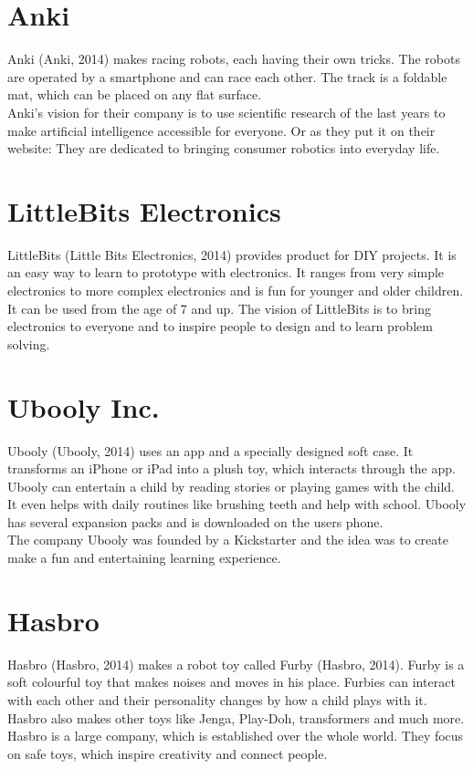 \documentclass[11pt,twoside,a4paper]{report}
\begin{document}
\begin{appendices}
\section{Anki}
Anki (Anki, 2014) makes racing robots, each having their own tricks. The robots are operated by a smartphone and can race each other. The track is a foldable mat, which can be placed on any flat surface. \\
Anki\rq{}s vision for their company is to use scientific research of the last years to make artificial intelligence accessible for everyone. Or as they put it on their website: They are dedicated to bringing consumer robotics into everyday life.
\section{LittleBits Electronics}
LittleBits (Little Bits Electronics, 2014) provides product for DIY projects. It is an easy way to learn to prototype with electronics. It ranges from very simple electronics to more complex electronics and is fun for younger and older children. It can be used from the age of 7 and up. The vision of LittleBits is to bring electronics to everyone and to inspire people to design and to learn problem solving.
\section{Ubooly Inc.}
Ubooly (Ubooly, 2014) uses an app and a specially designed soft case. It transforms an iPhone or iPad into a plush toy, which interacts through the app. Ubooly can entertain a child by reading stories or playing games with the child. It even helps with daily routines like brushing teeth and help with school. Ubooly has several expansion packs and is downloaded on the users phone. \\
The company Ubooly was founded by a Kickstarter and the idea was to create make a fun and entertaining learning experience.
\section{Hasbro}
Hasbro (Hasbro, 2014) makes a robot toy called Furby (Hasbro, 2014). Furby is a soft colourful toy that makes noises and moves in his place. Furbies can interact with each other and their personality changes by how a child plays with it.\\
Hasbro also makes other toys like Jenga, Play-Doh, transformers and much more. Hasbro is a large company, which is established over the whole world. They focus on safe toys, which inspire creativity and connect people.

\end{appendices}
\end{document}
